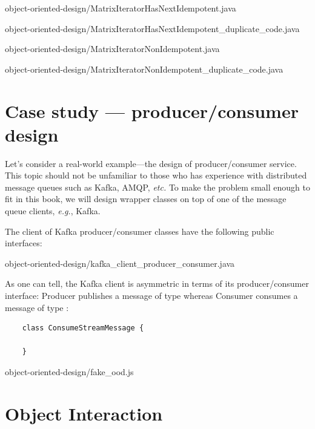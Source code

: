 
{object-oriented-design/MatrixIteratorHasNextIdempotent.java}


{object-oriented-design/MatrixIteratorHasNextIdempotent_duplicate_code.java}


{object-oriented-design/MatrixIteratorNonIdempotent.java}


{object-oriented-design/MatrixIteratorNonIdempotent_duplicate_code.java}


\section{Case study --- producer/consumer design}\label{sec:case-study-producer-consumer-design}

Let's consider a real-world example---the design of producer/consumer service.
This topic should not be unfamiliar to those who has experience with distributed message queues
such as Kafka, AMQP, \textit{etc.}
To make the problem small enough to fit in this book, we will design wrapper classes on top of
one of the message queue clients, \textit{e.g.}, Kafka.


The \java client of Kafka producer/consumer classes have the following public interfaces:


{object-oriented-design/kafka_client_producer_consumer.java}

As one can tell, the Kafka client is asymmetric in terms of its producer/consumer interface:
Producer publishes a message of type  whereas Consumer consumes a message of type
:
\begin{lstlisting}
    class ConsumeStreamMessage {

    }
\end{lstlisting}


{object-oriented-design/fake_ood.js}

\section{Object Interaction}\label{sec:object-interaction}


